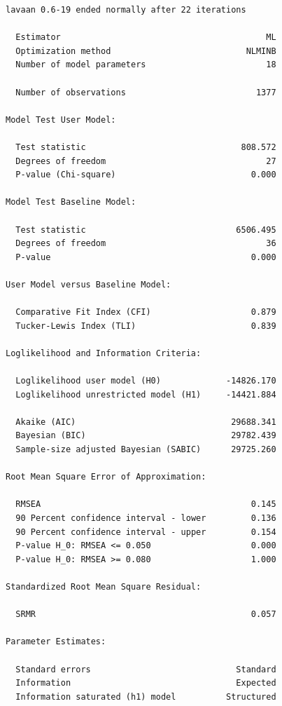 \documentclass[
  letterpaper,
  DIV=11,
  numbers=noendperiod]{scrreprt}
\begin{document}
\begin{verbatim}
lavaan 0.6-19 ended normally after 22 iterations

  Estimator                                         ML
  Optimization method                           NLMINB
  Number of model parameters                        18

  Number of observations                          1377

Model Test User Model:
                                                      
  Test statistic                               808.572
  Degrees of freedom                                27
  P-value (Chi-square)                           0.000

Model Test Baseline Model:

  Test statistic                              6506.495
  Degrees of freedom                                36
  P-value                                        0.000

User Model versus Baseline Model:

  Comparative Fit Index (CFI)                    0.879
  Tucker-Lewis Index (TLI)                       0.839

Loglikelihood and Information Criteria:

  Loglikelihood user model (H0)             -14826.170
  Loglikelihood unrestricted model (H1)     -14421.884
                                                      
  Akaike (AIC)                               29688.341
  Bayesian (BIC)                             29782.439
  Sample-size adjusted Bayesian (SABIC)      29725.260

Root Mean Square Error of Approximation:

  RMSEA                                          0.145
  90 Percent confidence interval - lower         0.136
  90 Percent confidence interval - upper         0.154
  P-value H_0: RMSEA <= 0.050                    0.000
  P-value H_0: RMSEA >= 0.080                    1.000

Standardized Root Mean Square Residual:

  SRMR                                           0.057

Parameter Estimates:

  Standard errors                             Standard
  Information                                 Expected
  Information saturated (h1) model          Structured


\end{verbatim}
\end{document}
